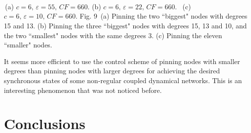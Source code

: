 \documentclass[11pt]{article}
\begin{document}
\begin{center}
\quad \unitlength=1cm \hbox{\hspace*{0.1cm} 
 }
\end{center}
\vskip0.1cm 
\begin{center}
\quad \unitlength=1cm \hbox{\hspace*{0.1cm} 
 \quad {}
 }
\end{center}
\vskip-0.6cm \qquad\qquad\quad\; \vskip0.1cm 
\begin{center}
\unitlength=1cm \hbox{\hspace*{0.1cm} 
 
 
 }
\end{center}
\vskip-1cm {\small \qquad\;\,(a) $c=6,\,\varepsilon=55,\,CF=660.$
\qquad\quad (b) $c=6,\,\varepsilon=22,\,CF=660.$ \qquad\quad\, (c)
$c=6,\,\varepsilon=10,\,CF=660.$} \vskip0.1cm {\small\qquad  Fig. 9
\,(a) Pinning the two ``biggest" nodes with degrees 15 and 13. (b)
Pinning the three ``biggest" nodes with degrees 15, 13 and 10, and
the two ``smallest" nodes with the same degrees 3. (c) Pinning the
eleven ``smaller" nodes.}

It seems more efficient to use the control scheme of pinning nodes
with smaller degrees than pinning nodes with larger degrees for
achieving the desired synchronous states of some non-regular coupled
dynamical networks. This is an interesting phenomenon that was not
noticed before.

\section{Conclusions}
\end{document}
